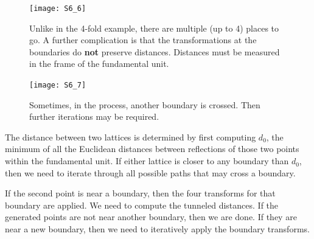 \documentclass[preprint]{iucr}              %
\numberwithin{equation}{section}
\begin{document}
\begin{figure}
	\texttt{[image: S6\_6]}
	\caption{	Unlike in the 4-fold example, there are multiple 
		(up to 4) 
		places to go. A further complication is that the transformations
		at the boundaries do \textbf{not} preserve distances. Distances
		must be measured in the frame of the fundamental unit.}
	\label{S6_6}
\end{figure}


\begin{figure}

\texttt{[image: S6\_7]}
\caption{Sometimes, in the process, another boundary is crossed. Then further iterations may be required.}
\label{S6_7}
\end{figure}

The distance between two lattices is determined by first computing $d_0$, the minimum of all the Euclidean distances between reflections of those two points within the fundamental unit.  If either lattice is closer to any boundary than $d_0$, then we need to iterate through all possible paths that may cross a boundary.


If the second point is near a boundary, then the four transforms for that boundary are applied. We need to compute the tunneled distances. If the generated points are not near another boundary, then we are done. If they are near a new boundary, then we need to iteratively apply the boundary transforms.
\end{document}
